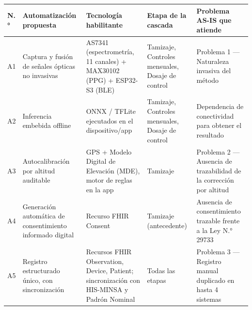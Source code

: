 \documentclass[11pt,a4paper]{article}
\begin{document}
{\small
\begin{longtable}[]{@{}
  >{\raggedright\arraybackslash}p{}
  >{\raggedright\arraybackslash}p{}
  >{\raggedright\arraybackslash}p{}
  >{\raggedright\arraybackslash}p{}
  >{\raggedright\arraybackslash}p{}@{}}
\toprule\noalign{}
\begin{minipage}[b]{\linewidth}\raggedright
N.°
\end{minipage} & \begin{minipage}[b]{\linewidth}\raggedright
Automatización propuesta
\end{minipage} & \begin{minipage}[b]{\linewidth}\raggedright
Tecnología habilitante
\end{minipage} & \begin{minipage}[b]{\linewidth}\raggedright
Etapa de la cascada
\end{minipage} & \begin{minipage}[b]{\linewidth}\raggedright
Problema AS-IS que atiende
\end{minipage} \\
\midrule\noalign{}
\endhead
\bottomrule\noalign{}
\endlastfoot
A1 & Captura y fusión de señales ópticas no invasivas & AS7341 (espectrometría, 11 canales) + MAX30102 (PPG) + ESP32-S3 (BLE) & Tamizaje, Controles mensuales, Dosaje de control & Problema 1 --- Naturaleza invasiva del método \\
A2 & Inferencia embebida offline & ONNX / TFLite ejecutados en el dispositivo/app & Tamizaje, Controles mensuales, Dosaje de control & Dependencia de conectividad para obtener el resultado \\
A3 & Autocalibración por altitud auditable & GPS + Modelo Digital de Elevación (MDE), motor de reglas en la app & Tamizaje & Problema 2 --- Ausencia de trazabilidad de la corrección por altitud \\
A4 & Generación automática de consentimiento informado digital & Recurso FHIR Consent & Tamizaje (antecedente) & Ausencia de consentimiento trazable frente a la Ley N.° 29733 \\
A5 & Registro estructurado único, con sincronización & Recursos FHIR Observation, Device, Patient; sincronización con HIS-MINSA y Padrón Nominal & Todas las etapas & Problema 3 --- Registro manual duplicado en hasta 4 sistemas \\

\end{longtable}}
\end{document}
